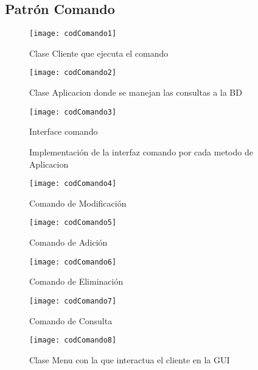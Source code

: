\subsection{Patrón Comando}
\begin{figure}[H]
	\centering
	\texttt{[image: codComando1]}
	\centering
	\caption{Clase Cliente que ejecuta el comando}
	\label{fig:codComando1}
\end{figure}
\clearpage
\begin{figure}[H]
	\centering
	\texttt{[image: codComando2]}
	\centering
	\caption{Clase Aplicacion donde se manejan las consultas a la BD}
	\label{fig:codComando2}
\end{figure}
\begin{figure}[H]
	\centering
	\texttt{[image: codComando3]}
	\centering
	\caption{Interface comando}
	\label{fig:codComando3}
\end{figure}
\begin{figure}[H]
	\centering
	\caption{Implementación de la interfaz comando por cada metodo de Aplicacion}
	\texttt{[image: codComando4]}
	\caption{Comando de Modificación}
	\centering
	\label{fig:codComando4}
\end{figure}
\begin{figure}[H]
	\centering
	\texttt{[image: codComando5]}
	\centering
	\caption{Comando de Adición}
	\label{fig:codComando5}
\end{figure}
\begin{figure}[H]
	\centering
	\texttt{[image: codComando6]}
	\centering
	\caption{Comando de Eliminación}
	\label{fig:codComando6}
\end{figure}
\begin{figure}[H]
	\centering
	\texttt{[image: codComando7]}
	\centering
	\caption{Comando de Consulta}
	\label{fig:codComando7}
\end{figure}
\begin{figure}[H]
	\centering
	\texttt{[image: codComando8]}
	\centering
	\caption{Clase Menu con la que interactua el cliente en la GUI}
	\label{fig:codComando8}
\end{figure}

